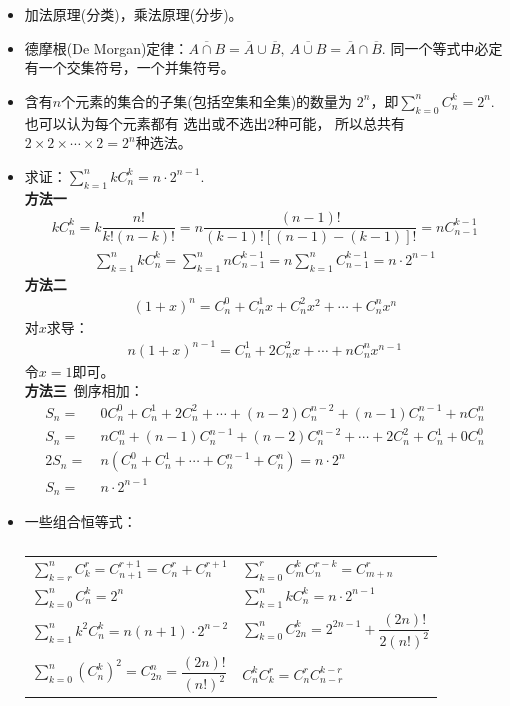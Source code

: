 \begin{itemize}[leftmargin=\inteval{\myitemleftmargin}pt,itemsep=
   \inteval{\myitemitempsep}pt,topsep=\inteval{\myitemtopsep}pt]
\item 加法原理(分类)，乘法原理(分步)。
\item 德摩根(De Morgan)定律：$ \overline{A \cap B}=\overline{A}\cup 
\overline{B},\ \overline{A \cup B}=\overline{A}\cap \overline{B} $. 
同一个等式中必定有一个交集符号，一个并集符号。

\item 含有$ n $个元素的集合的子集(包括空集和全集)的数量为
$ 2^n $，即$\sum\limits_{k=0}^{n} C_n^k=2^{n} $. 也可以认为每个元素都有
选出或不选出2种可能，
所以总共有$2\times 2\times \cdots\times 2= 2^n $种选法。

\item 求证：$ \sum\limits_{k=1}^{n} kC_n^k=n\cdot2^{n-1} $. \\
\textbf{方法一} 
\begin{gather*}
    kC_n^k=k\dfrac{n!}{k!(n-k)!}=n\dfrac{(n-1)!}{(k-1)![(n-1)-(k-1)]!}=nC_{n-1}^{k-1} 	
\end{gather*}
\begin{gather*}
    \sum_{k=1}^{n} kC_n^k=\sum_{k=1}^{n} nC_{n-1}^{k-1}=n\sum_{k=1}^{n} C_{n-1}^{k-1}
    =n\cdot 2^{n-1}
\end{gather*}
\textbf{方法二}
\begin{align*}
    (1+x)^n=C_n^0+C_n^1x+C_n^2x^2+\cdots + C_n^nx^n
\end{align*}
对$ x $求导：
\begin{align} \label{二项展开式两边求导}
    n(1+x)^{n-1}=C_n^1+2C_n^2x+\cdots + nC_n^nx^{n-1}
\end{align}
令$ x=1 $即可。\\
\textbf{方法三}\ 倒序相加：
\begin{align*}
    S_n=&\ 0C_n^0+C_n^1+2C_n^2+\cdots+(n-2)C_n^{n-2} +(n-1)C_n^{n-1}+ nC_n^n \\
    S_n=&\ nC_n^n+(n-1)C_n^{n-1}+(n-2)C_n^{n-2}+\cdots+2C_n^2+ C_n^1 +0C_n^0 \\
    2S_n=&\ n(C_n^0+C_n^1+\cdots +C_{n}^{n-1}+C_n^n)=n\cdot 2^n \\
    S_n=&\  n\cdot 2^{n-1}
\end{align*}

\item 一些组合恒等式：
\begin{table}[h] 
\caption{} 
\centering
\begin{tabular}{l|l} \label{组合恒等式}
    $\sum\limits_{k=r}^{n} C_k^r=C_{n+1}^{r+1}=C_n^r+C_n^{r+1}$  &		
    $\sum\limits_{k=0}^{r}C_m^kC_n^{r-k}=C_{m+n}^r $     \\
    $\sum\limits_{k=0}^{n} C_n^k=2^{n} $		&
    $\sum\limits_{k=1}^{n} kC_n^k=n\cdot2^{n-1} $  \\
    $\sum\limits_{k=1}^{n} k^2C_n^k=n(n+1)\cdot2^{n-2} $  &
    $\sum\limits_{k=0}^{n} C_{2n}^k=2^{2n-1}+\dfrac{(2n)!}{2(n!)^2} $  \\
    $\sum\limits_{k=0}^{n} \left( C_{n}^k\right) ^2=C_{2n}^n=\dfrac{(2n)!}{(n!)^2} $  &
    $C_n^kC_k^r=C_n^rC_{n-r}^{k-r} $
\end{tabular}
\end{table} 


\end{itemize}
